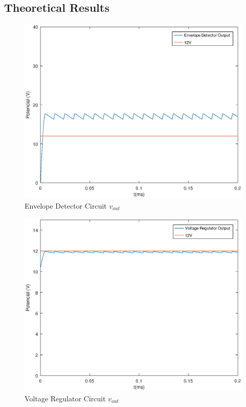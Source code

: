 
\subsection{Theoretical Results}
\label{subsec:res_the}

\begin{figure}[ht]
	\centering
	\includegraphics[width=1\linewidth]{envelope_detector.eps}
	\caption{Envelope Detector Circuit $v_{out}$}
\label{fig:EV_vout_a}
\end{figure}

\begin{figure}[ht]
	\centering
	\includegraphics[width=1\linewidth]{voltage_regulator.eps}
	\caption{Voltage Regulator Circuit $v_{out}$}
\label{fig:VR_vout_a}
\end{figure}

